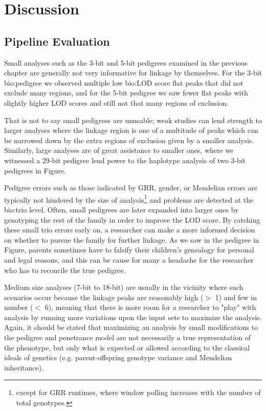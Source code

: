 \chapter{Discussion}

\section{Pipeline Evaluation}

Small analyses such as the 3-bit and 5-bit pedigrees examined in the previous chapter are generally not very informative for linkage by themselves. For the 3-bit \gls{bio:pedigree} we observed multiple low \gls{bio:LOD} score flat peaks that did not exclude many regions, and for the 5-bit pedigree we saw fewer flat peaks with slightly higher LOD scores and still not that many regions of exclusion.

That is not to say small pedigrees are unusable; weak studies can lend strength to larger analyses where the linkage region is one of a multitude of peaks which can be narrowed down by the extra regions of exclusion given by a smaller analysis. Similarly, large analyses are of great assistance to smaller ones, where we witnessed a 29-bit pedigree lend power to the haplotype analysis of two 3-bit pedigrees in Figure.

Pedigree errors such as those indicated by GRR, gender, or Mendelian errors are typically not hindered by the size of analysis\footnote{except for GRR runtimes, where window polling increases with the number of total genotypes.} and problems are detected at the \gls{bio:trio} level. Often, small pedigrees are later expanded into larger ones by genotyping the rest of the family in order to improve the LOD score. By catching these small trio errors early on, a researcher can make a more informed decision on whether to pursue the family for further linkage. As we saw in the pedigree in Figure, parents sometimes have to falsify their children's genealogy for personal and legal reasons, and this can be cause for many a headache for the researcher who has to reconcile the true pedigree.

Medium size analyses (7-bit to 18-bit) are usually in the vicinity where such scenarios occur because the linkage peaks are reasonably high ($>$ 1) and few in number ($<$ 6), meaning that there is more room for a researcher to "play" with analysis by running more variations upon the input sets to maximize the analysis. Again, it should be stated that maximizing an analysis by small modifications to the pedigree and penetrance model are not necessarily a true representation of the phenotype, but only what is expected or allowed according to the classical ideals of genetics (e.g. parent-offspring genotype variance and Mendelian inheritance).

